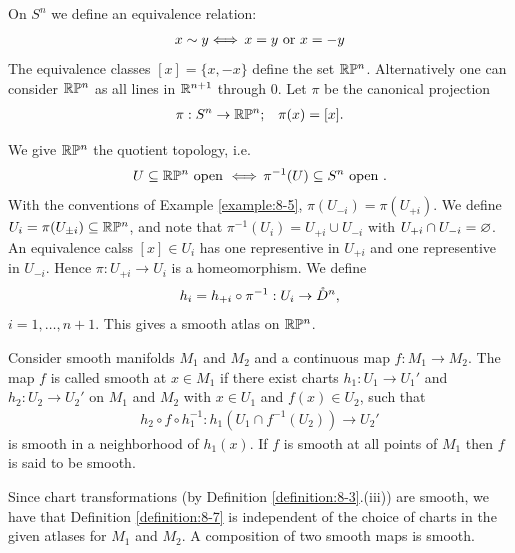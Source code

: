\begin{example}\label{example:8-6}
  On $S^n$ we define an equivalence relation:
  \begin{align*}
    x\sim y \Longleftrightarrow\, x = y \text{ or } x = -y
  \end{align*}
  The equivalence classes $[x] = \{x, -x\}$ define the set ${\mathbb{R}}\mathbb{P}^n$. Alternatively one can
  consider ${\mathbb{R}}\mathbb{P}^n$ as all lines in ${\mathbb{R}}^{n+1}$ through 0. Let $\pi$ be the canonical projection
  \begin{align*}
    \pi:S^n\to {\ensuremath{\mathbb{R}}}\mathbb{P}^n; && \pi(x) = [x].
  \end{align*}

  We give ${\mathbb{R}}\mathbb{P}^n$ the quotient topology, i.e.
  \begin{align*}
    U\subseteq {\ensuremath{\mathbb{R}}}\mathbb{P}^n \text{ open } \Longleftrightarrow\, \pi^{-1}(U)\subseteq S^n \text{ open }.
  \end{align*}
  With the conventions of Example \ref{example:8-5}, $\pi(U_{-i}) = \pi(U_{+i})$. We define 
  $U_i = \pi(U_{\pm i})\subseteq {\ensuremath{\mathbb{R}}}\mathbb{P}^n$, and note that $\pi^{-1}(U_i) = U_{+i}\cup U_{-i}$ with 
  $U_{+i}\cap U_{-i}=\varnothing$. An equivalence calss $[x]\in U_i$ has one representive in $U_{+i}$ and 
  one representive in $U_{-i}$. Hence $\pi:U_{+i}\to U_i$ is a homeomorphism. We define
  \begin{align*}
    h_i = h_{+i}\circ \pi^{-1}:U_i\to\mathring{D}^n,
  \end{align*}
  $i=1, \ldots, n+1$. This gives a smooth atlas on ${\mathbb{R}}\mathbb{P}^n$.
\end{example}

\begin{definition}\label{definition:8-7}
  Consider smooth manifolds $M_1$ and $M_2$ and a continuous map $f: M_1\to M_2$.
  The map $f$ is called smooth at $x\in M_1$ if there exist charts
  $h_1:U_1\to U_1'$ and $h_2:U_2\to U_2'$ on $M_1$ and $M_2$ with $x\in U_1$ and $f(x)\in U_2$,
  such that
  \begin{align*}
    h_2\circ f\circ h_1^{-1}:h_1(U_1\cap f^{-1}(U_2))\to U_2'
  \end{align*}
  is smooth in a neighborhood of $h_1(x)$. If $f$ is smooth at all points of $M_1$ then $f$ is said 
  to be smooth.
\end{definition}

Since chart transformations (by Definition \ref{definition:8-3}.(iii)) are smooth, we have that
Definition \ref{definition:8-7} is independent of the choice of charts in the given atlases for $M_1$
and $M_2$. A composition of two smooth maps is smooth. 

